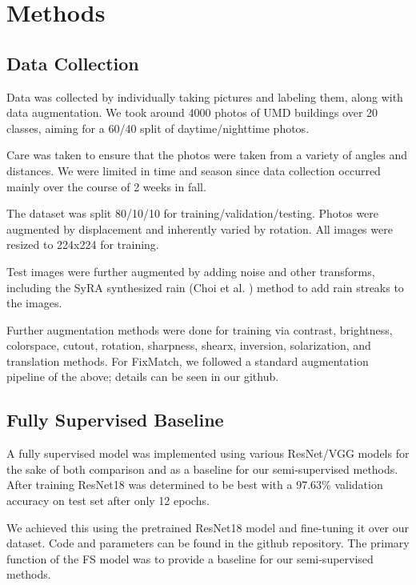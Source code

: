 \documentclass{article}
\begin{document}
\section{Methods}
\label{method}

\subsection{Data Collection}

Data was collected by individually taking pictures and labeling them, along with data augmentation. We took around 4000 photos of UMD buildings over 20 classes, aiming for a 60/40 split of daytime/nighttime photos.

Care was taken to ensure that the photos were taken from a variety of angles and distances. We were limited in time and season since data collection occurred mainly over the course of 2 weeks in fall. 


The dataset was split 80/10/10 for training/validation/testing. Photos were augmented by displacement and inherently varied by rotation. All images were resized to 224x224 for training. 

Test images were further augmented by adding noise and other transforms, including the SyRA synthesized rain (Choi et al. \cite{choi}) method to add rain streaks to the images. 

Further augmentation methods were done for training via contrast, brightness, colorspace, cutout, rotation, sharpness, shearx, inversion, solarization, and translation methods. For FixMatch, we followed a standard augmentation pipeline of the above; details can be seen in our github.

\subsection{Fully Supervised Baseline}

A fully supervised model was implemented using various ResNet/VGG models for the sake of both comparison and as a baseline for our semi-supervised methods. After training ResNet18 was determined to be best with a 97.63\% validation accuracy on test set after only 12 epochs. 

We achieved this using the pretrained ResNet18 model and fine-tuning it over our dataset. Code and parameters can be found in the github repository. The primary function of the FS model was to provide a baseline for our semi-supervised methods.
\end{document}
